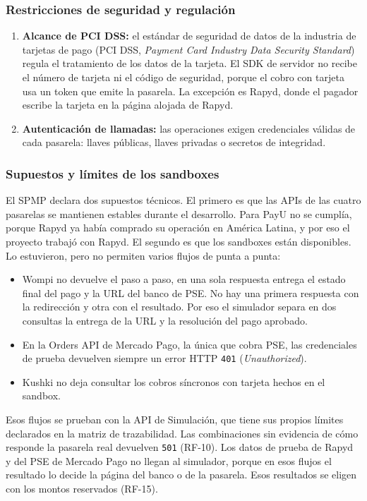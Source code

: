 \subsubsection{Restricciones de seguridad y regulación}
\begin{enumerate}
    \item \textbf{Alcance de PCI DSS:} el estándar de seguridad de datos de la industria de tarjetas de pago (PCI DSS, \textit{Payment Card Industry Data Security Standard}) regula el tratamiento de los datos de la tarjeta. El SDK de servidor no recibe el número de tarjeta ni el código de seguridad, porque el cobro con tarjeta usa un token que emite la pasarela. La excepción es Rapyd, donde el pagador escribe la tarjeta en la página alojada de Rapyd.
    \item \textbf{Autenticación de llamadas:} las operaciones exigen credenciales válidas de cada pasarela: llaves públicas, llaves privadas o secretos de integridad.
\end{enumerate}

\subsubsection{Supuestos y límites de los sandboxes}
El SPMP declara dos supuestos técnicos. El primero es que las APIs de las cuatro pasarelas se mantienen estables durante el desarrollo. Para PayU no se cumplía, porque Rapyd ya había comprado su operación en América Latina, y por eso el proyecto trabajó con Rapyd. El segundo es que los sandboxes están disponibles. Lo estuvieron, pero no permiten varios flujos de punta a punta:
\begin{itemize}
    \item Wompi no devuelve el paso a paso, en una sola respuesta entrega el estado final del pago y la URL del banco de PSE. No hay una primera respuesta con la redirección y otra con el resultado. Por eso el simulador separa en dos consultas la entrega de la URL y la resolución del pago aprobado.
    \item En la Orders API de Mercado Pago, la única que cobra PSE, las credenciales de prueba devuelven siempre un error HTTP \texttt{401} (\textit{Unauthorized}).
    \item Kushki no deja consultar los cobros síncronos con tarjeta hechos en el sandbox.
\end{itemize}
Esos flujos se prueban con la API de Simulación, que tiene sus propios límites declarados en la matriz de trazabilidad. Las combinaciones sin evidencia de cómo responde la pasarela real devuelven \texttt{501} (RF-10). Los datos de prueba de Rapyd y del PSE de Mercado Pago no llegan al simulador, porque en esos flujos el resultado lo decide la página del banco o de la pasarela. Esos resultados se eligen con los montos reservados (RF-15).

